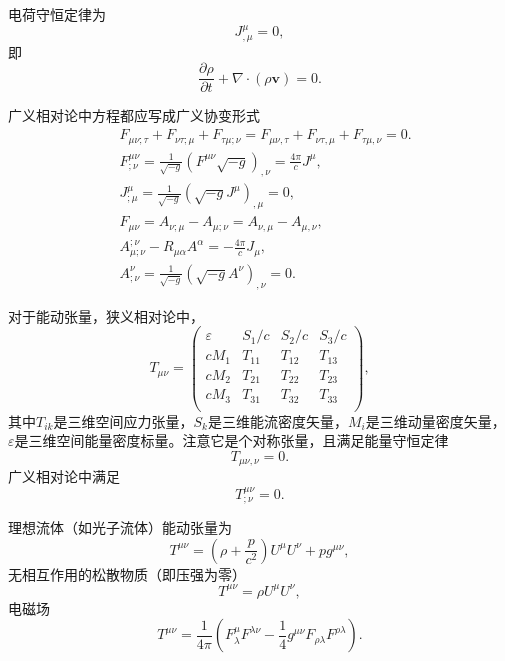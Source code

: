 \documentclass[11pt, a4paper, oneside, onecolumn]{ctexart}
\numberwithin{equation}{subsection}
\begin{document}
电荷守恒定律为
\begin{equation}
J^{\mu}_{,\mu}=0,
\end{equation}
即
\begin{equation}
\frac{\partial{}\rho}{\partial{}t}+\nabla\cdot\left(\rho\boldsymbol{v}\right)=0.
\end{equation}

广义相对论中方程都应写成广义协变形式
\begin{align}
&F_{\mu\nu;\tau}+F_{\nu\tau;\mu}+F_{\tau\mu;\nu}=F_{\mu\nu,\tau}+F_{\nu\tau,\mu}+F_{\tau\mu,\nu}=0.\\
&F^{\mu\nu}_{;\nu}=\frac{1}{\sqrt{-g}}\left(F^{\mu\nu}\sqrt{-g}\right)_{,\nu}=\frac{4\pi}{c}J^{\mu},\\
&J^{\mu}_{;\mu}=\frac{1}{\sqrt{-g}}\left(\sqrt{-g}J^{\mu}\right)_{,\mu}=0,\\
&F_{\mu\nu}=A_{\nu;\mu}-A_{\mu;\nu}=A_{\nu,\mu}-A_{\mu,\nu},\\
&A_{\mu;\nu}^{;\nu}-R_{\mu\alpha}A^{\alpha}=-\frac{4\pi}{c}J_{\mu},\\
&A^{\nu}_{;\nu}=\frac{1}{\sqrt{-g}}\left(\sqrt{-g}A^{\nu}\right)_{,\nu}=0.
\end{align}

对于能动张量，狭义相对论中，
\begin{equation}
T_{\mu\nu}=\begin{pmatrix}
\varepsilon & S_{1}/c & S_{2}/c & S_{3}/c\\
cM_{1} & T_{11} & T_{12} & T_{13}\\
cM_{2} & T_{21} & T_{22} & T_{23}\\
cM_{3} & T_{31} & T_{32} & T_{33}\\
\end{pmatrix},
\end{equation}
其中$T_{ik}$是三维空间应力张量，$S_{k}$是三维能流密度矢量，$M_{i}$是三维动量密度矢量，$\varepsilon$是三维空间能量密度标量。注意它是个对称张量，且满足能量守恒定律
\begin{equation}
T_{\mu\nu,\nu}=0.
\end{equation}
广义相对论中满足
\begin{equation}
T^{\mu\nu}_{;\nu}=0.
\end{equation}

理想流体（如光子流体）能动张量为
\begin{equation}
T^{\mu\nu}=\left(\rho+\frac{p}{c^{2}}\right)U^{\mu}U^{\nu}+pg^{\mu\nu},
\end{equation}
无相互作用的松散物质（即压强为零）
\begin{equation}
T^{\mu\nu}=\rho U^{\mu}U^{\nu},
\end{equation}
电磁场
\begin{equation}
T^{\mu\nu}=\frac{1}{4\pi}\left(F_{\lambda}^{\mu}F^{\lambda\nu}-\frac{1}{4}g^{\mu\nu}F_{\rho\lambda}F^{\rho\lambda}\right).
\end{equation}
\end{document}
